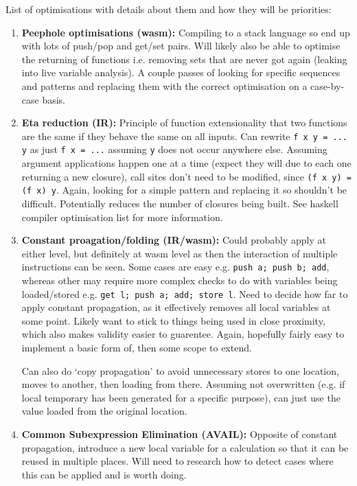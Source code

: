 \documentclass[10pt,twoside,a4paper]{article}
\begin{document}

List of optimisations with details about them and how they will be priorities:

\begin{enumerate}
\item \textbf{Peephole optimisations (wasm): } Compiling to a stack language so end up with lots of push/pop and get/set pairs. Will likely also  be able to optimise the returning of functions i.e. removing sets that are never got again (leaking into live variable analysis). A couple passes of looking for specific sequences and patterns and replacing them with the correct optimisation on a case-by-case basis.

\item \textbf{Eta reduction (IR): } Principle of function extensionality that two functions are the same if they behave the same on all inputs. Can rewrite \verb|f x y = ... y| as just \verb|f x = ...| assuming \verb|y| does not occur anywhere else. Assuming argument applications happen one at a time (expect they will due to each one returning a new closure), call sites don't need to be modified, since \verb|(f x y) = (f x) y|. Again, looking for a simple pattern and replacing it so shouldn't be difficult. Potentially reduces the number of closures being built. See haskell compiler optimisation list for more information.

\item \textbf{Constant proagation/folding (IR/wasm): } Could probably apply at either level, but definitely at wasm level as then the interaction of multiple instructions can be seen. Some cases are easy e.g. \verb|push a; push b; add|, whereas other may require more complex checks to do with variables being loaded/stored e.g. \verb|get l; push a; add; store l|. Need to decide how far to apply constant propagation, as it effectively removes all local variables at some point. Likely want to stick to things being used in close proximity, which also makes validity easier to guarentee. Again, hopefully fairly easy to implement a basic form of, then some scope to extend. 

Can also do `copy propagation' to avoid unnecessary stores to one location, moves to another, then loading from there. Assuming not overwritten (e.g. if local temporary has been generated for a specific purpose), can just use the value loaded from the original location.

\item \textbf{Common Subexpression Elimination (AVAIL): } Opposite of constant propagation, introduce a new local variable for a calculation so that it can be reused in multiple places. Will need to research how to detect cases where this can be applied and is worth doing.


\end{enumerate}
\end{document}
